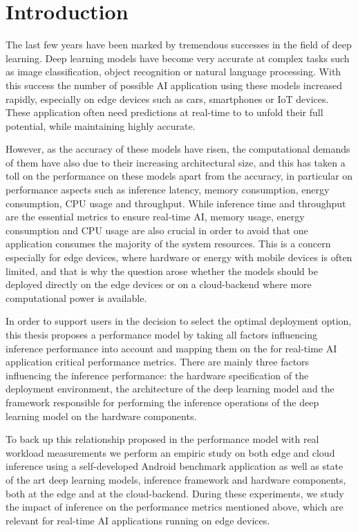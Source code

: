 \chapter{Introduction}


The last few years have been marked by tremendous successes in the field of deep learning.
Deep learning models have become very accurate at complex tasks such as image classification, object recognition or natural language processing. 
With this success the number of possible AI application using these models increased rapidly, especially on edge devices such as cars, smartphones or IoT devices.
These application often need predictions at real-time to to unfold their full potential, while maintaining highly accurate.

However, as the accuracy of these models have risen, the computational demands of them have also due to their increasing architectural size, and this has taken a toll on the performance on these models apart from the accuracy, in particular on performance aspects such as inference latency, memory consumption, energy consumption, CPU usage and throughput. 
While inference time and throughput are the essential metrics to ensure real-time AI, memory usage, energy consumption and CPU usage are also crucial in order to avoid that one application consumes the majority of the system resources.
This is a concern especially for edge devices, where hardware or energy with mobile devices is often limited, and that is why the question arose whether the models should be deployed directly on the edge devices or on a cloud-backend where more computational power is available. 


In order to support users in the decision to select the optimal deployment option, this thesis proposes a performance model by taking all factors influencing inference performance into account and mapping them on the for real-time AI application critical performance metrics.
There are mainly three factors influencing the inference performance: the hardware specification of the deployment environment, the architecture of the deep learning model and the framework responsible for performing the inference operations of the deep learning model on the hardware components.

To back up this relationship proposed in the performance model with real workload measurements we perform an empiric study on both edge and cloud inference using a self-developed Android benchmark application as well as state of the art deep learning models, inference framework and hardware components, both at the edge and at the cloud-backend.
During these experiments, we study the impact of inference on the performance metrics mentioned above, which are relevant for real-time AI applications running on edge devices.


